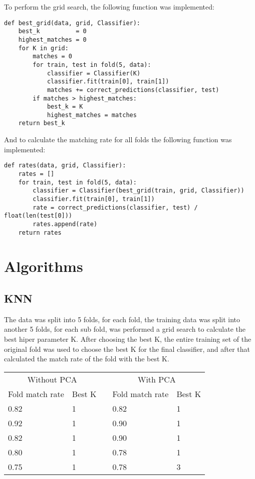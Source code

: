\documentclass{article}
\begin{document}
To perform the grid search, the following function was implemented:

\begin{lstlisting}
def best_grid(data, grid, Classifier):
    best_k          = 0
    highest_matches = 0
    for K in grid:
        matches = 0
        for train, test in fold(5, data):
            classifier = Classifier(K)
            classifier.fit(train[0], train[1])
            matches += correct_predictions(classifier, test)
        if matches > highest_matches:
            best_k = K
            highest_matches = matches
    return best_k
\end{lstlisting}

\newpage

And to calculate the matching rate for all folds the following function was implemented:

\begin{lstlisting}
def rates(data, grid, Classifier):
    rates = []
    for train, test in fold(5, data):
        classifier = Classifier(best_grid(train, grid, Classifier))
        classifier.fit(train[0], train[1])
        rate = correct_predictions(classifier, test) / float(len(test[0]))
        rates.append(rate)
    return rates
\end{lstlisting}

\section{Algorithms}

\subsection{KNN}
The data was split into 5 folds, for each fold, the training data was split into another 5 folds, for each sub fold, was performed a grid search to calculate the best hiper parameter K. After choosing the best K, the entire training set of the original fold was used to choose the best K for the final classifier, and after that calculated the match rate of the fold with the best K.

\begin{table}[h]
    \begin{tabular}{|l|l|l|l|l|}
    \cline{1-2} \cline{4-5}
    \multicolumn{2}{|c|}{Without PCA} &  & \multicolumn{2}{|c|}{With PCA} \\ \cline{1-2} \cline{4-5}
    Fold match rate & Best K &  & Fold match rate & Best K  \\ \cline{1-2} \cline{4-5} 
    0.82 & 1 &  & 0.82 & 1  \\ \cline{1-2} \cline{4-5} 
    0.92 & 1 &  & 0.90 & 1  \\ \cline{1-2} \cline{4-5} 
    0.82 & 1 &  & 0.90 & 1  \\ \cline{1-2} \cline{4-5} 
    0.80 & 1 &  & 0.78 & 1  \\ \cline{1-2} \cline{4-5} 
    0.75 & 1 &  & 0.78 & 3  \\ \cline{1-2} \cline{4-5}
    \end{tabular}
\end{table}
\end{document}
